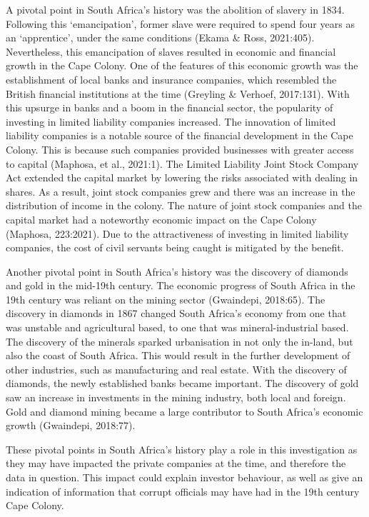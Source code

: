 \documentclass[12pt,preprint, authoryear]{elsarticle}
\numberwithin{equation}{section}
\numberwithin{figure}{section}
\numberwithin{table}{section}
\begin{document}
A pivotal point in South Africa's history was the abolition of slavery
in 1834. Following this `emancipation', former slave were required to
spend four years as an `apprentice', under the same conditions (Ekama \&
Ross, 2021:405). Nevertheless, this emancipation of slaves resulted in
economic and financial growth in the Cape Colony. One of the features of
this economic growth was the establishment of local banks and insurance
companies, which resembled the British financial institutions at the
time (Greyling \& Verhoef, 2017:131). With this upsurge in banks and a
boom in the financial sector, the popularity of investing in limited
liability companies increased. The innovation of limited liability
companies is a notable source of the financial development in the Cape
Colony. This is because such companies provided businesses with greater
access to capital (Maphosa, et al., 2021:1). The Limited Liability Joint
Stock Company Act extended the capital market by lowering the risks
associated with dealing in shares. As a result, joint stock companies
grew and there was an increase in the distribution of income in the
colony. The nature of joint stock companies and the capital market had a
noteworthy economic impact on the Cape Colony (Maphosa, 223:2021). Due
to the attractiveness of investing in limited liability companies, the
cost of civil servants being caught is mitigated by the benefit.

Another pivotal point in South Africa's history was the discovery of
diamonds and gold in the mid-19th century. The economic progress of
South Africa in the 19th century was reliant on the mining sector
(Gwaindepi, 2018:65). The discovery in diamonds in 1867 changed South
Africa's economy from one that was unstable and agricultural based, to
one that was mineral-industrial based. The discovery of the minerals
sparked urbanisation in not only the in-land, but also the coast of
South Africa. This would result in the further development of other
industries, such as manufacturing and real estate. With the discovery of
diamonds, the newly established banks became important. The discovery of
gold saw an increase in investments in the mining industry, both local
and foreign. Gold and diamond mining became a large contributor to South
Africa's economic growth (Gwaindepi, 2018:77).

\newpage

These pivotal points in South Africa's history play a role in this
investigation as they may have impacted the private companies at the
time, and therefore the data in question. This impact could explain
investor behaviour, as well as give an indication of information that
corrupt officials may have had in the 19th century Cape Colony.
\end{document}

